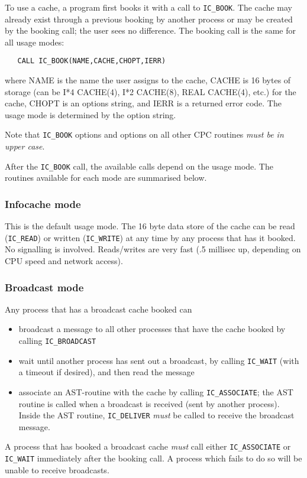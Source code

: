 To use a cache, a program first books it with a call to \verb|IC_BOOK|.
The cache may already exist through a previous booking by another
process or may be created by the booking call; the user sees no
difference. The booking call is the same for all usage modes:

\begin{verbatim}
   CALL IC_BOOK(NAME,CACHE,CHOPT,IERR)
\end{verbatim}
where NAME is the name the user assigns to the cache, CACHE is
16 bytes of storage (can be I*4 CACHE(4), I*2 CACHE(8), REAL CACHE(4),
etc.) for the cache, CHOPT is an options string, and IERR is
a returned error code. The usage mode is determined by the option
string.

Note that \verb|IC_BOOK| options and options on all other CPC routines
{\em must be in upper case}.

After the \verb|IC_BOOK| call, the available calls depend on the usage
mode. The routines available for each mode are summarised below.

\subsubsection{Infocache mode}
   This is the default usage mode. The 16 byte data store of the cache
   can be read (\verb|IC_READ|) or written (\verb|IC_WRITE|)
   at any time by any process that has it booked.
   No signalling is involved.
   Reads/writes are very fast (.5 millisec up, depending on CPU speed
   and network access).

\subsubsection{Broadcast mode}
  Any process that has a broadcast cache booked can
  \begin{itemize}
     \item broadcast a message to all other processes that have
       the cache booked by calling \verb|IC_BROADCAST|
     \item wait until another process has sent out a broadcast, by calling
       \verb|IC_WAIT| (with a timeout if desired), and then read the message
     \item associate an AST-routine with the cache by calling
       \verb|IC_ASSOCIATE|;
       the AST routine is called when a broadcast is received (sent by
       another process).
       Inside the AST routine, \verb|IC_DELIVER| {\em must\/}
       be called to receive the broadcast message.
   \end{itemize}
   A process that has booked a broadcast cache {\em must\/} call either
   \verb|IC_ASSOCIATE| or \verb|IC_WAIT| immediately after the booking call.
   A process which fails to do so will be unable to receive broadcasts.

